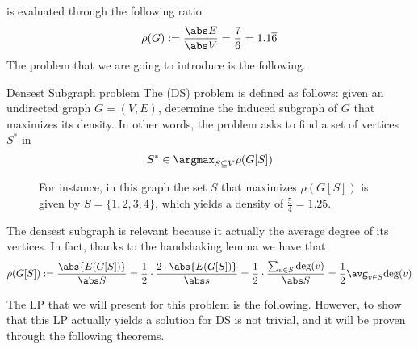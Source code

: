 \documentclass[a4paper, 12pt]{report}
\begin{document}
    is evaluated through the following ratio $$\rho(G) := \dfrac{\abs E}{\abs V} = \dfrac{7}{6} = 1.1 \overline 6$$ The problem that we are going to introduce is the following.

    \begin{frameddefn}{Densest Subgraph problem}
        The  (DS) problem is defined as follows: given an undirected graph $G = (V, E)$, determine the induced subgraph of $G$ that maximizes its density. In other words, the problem asks to find a set of vertices $S^*$ in $$S^* \in \argmax_{S \subseteq V}{\rho(G[S])}$$
    \end{frameddefn}

    \begin{figure}[H]
        \centering
        \caption{For instance, in this graph the set $S$ that maximizes $\rho(G[S])$ is given by $S = \{1, 2, 3, 4\}$, which yields a density of $\tfrac{5}{4} = 1.25$.}
    \end{figure}

    The densest subgraph is relevant because it actually  the average degree of its vertices. In fact, thanks to the handshaking lemma we have that $$\rho(G[S]) := \dfrac{\abs{E(G[S])}}{\abs S} = \dfrac{1}{2} \cdot \dfrac{2 \cdot \abs{E(G[S])}}{\abs s} = \dfrac{1}{2} \cdot \dfrac{\sum_{v \in S}{\deg (v)}}{\abs S} = \dfrac{1}{2} \avg_{v \in S}{\deg(v)}$$

    The LP that we will present for this problem is the following. However, to show that this LP actually yields a solution for DS is not trivial, and it will be proven through the following theorems.
\end{document}
